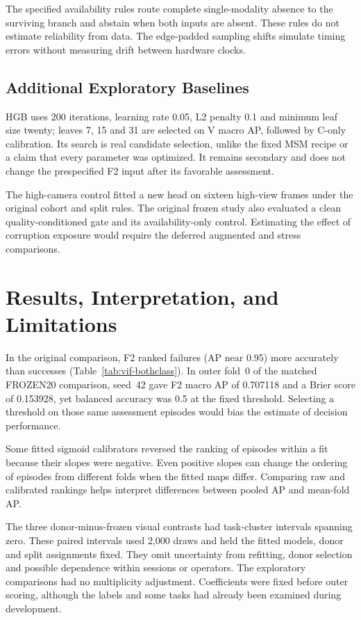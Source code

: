 The specified availability rules route complete single-modality absence to the surviving branch and abstain when both inputs are absent. These rules do not estimate reliability from data. The edge-padded sampling shifts simulate timing errors without measuring drift between hardware clocks.

\subsection{Additional Exploratory Baselines}
HGB uses 200 iterations, learning rate 0.05, L2 penalty 0.1 and minimum leaf size twenty; leaves 7, 15 and 31 are selected on V macro AP, followed by C-only calibration. Its search is real candidate selection, unlike the fixed MSM recipe or a claim that every parameter was optimized. It remains secondary and does not change the prespecified F2 input after its favorable assessment.

The high-camera control fitted a new head on sixteen high-view frames under the original cohort and split rules. The original frozen study also evaluated a clean quality-conditioned gate and its availability-only control. Estimating the effect of corruption exposure would require the deferred augmented and stress comparisons.

\section{Results, Interpretation, and Limitations}
In the original comparison, F2 ranked failures (AP near 0.95) more accurately than successes (Table~\ref{tab:vif-bothclass}). In outer fold~0 of the matched FROZEN20 comparison, seed~42 gave F2 macro AP of 0.707118 and a Brier score of 0.153928, yet balanced accuracy was 0.5 at the fixed threshold. Selecting a threshold on those same assessment episodes would bias the estimate of decision performance.

Some fitted sigmoid calibrators reversed the ranking of episodes within a fit because their slopes were negative. Even positive slopes can change the ordering of episodes from different folds when the fitted maps differ. Comparing raw and calibrated rankings helps interpret differences between pooled AP and mean-fold AP.

The three donor-minus-frozen visual contrasts had task-cluster intervals spanning zero. These paired intervals used 2,000 draws and held the fitted models, donor and split assignments fixed. They omit uncertainty from refitting, donor selection and possible dependence within sessions or operators. The exploratory comparisons had no multiplicity adjustment. Coefficients were fixed before outer scoring, although the labels and some tasks had already been examined during development.

